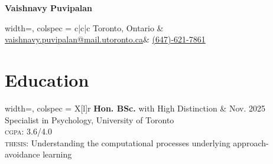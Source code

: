 \documentclass[12pt, letterpaper]{article}
\begin{document}

\begin{center}
\textbf{\large{Vaishnavy Puvipalan}} \\
    \begin{longtblr}{width=\textwidth, colspec = {c|c|c}}
    Toronto, Ontario & \href{mailto:vaishnavy.puvipalan@mail.utoronto.ca}{vaishnavy.puvipalan@mail.utoronto.ca}& \href{tel:(647)-621-7861}{(647)-621-7861}
    \end{longtblr}
\end{center}


\section{Education}
\begin{center}
\begin{longtblr}[presep=0em]{width=\textwidth, colspec = {X[l]r}}
    \textbf{Hon. BSc.} with High Distinction & Nov. 2025 \\
    Specialist in Psychology, University of Toronto \\
    \textsc{cgpa:} 3.6/4.0 \\
    \textsc{thesis:} Understanding the computational processes underlying approach-avoidance learning \\
    \end{longtblr}
\end{center}

\end{document}
